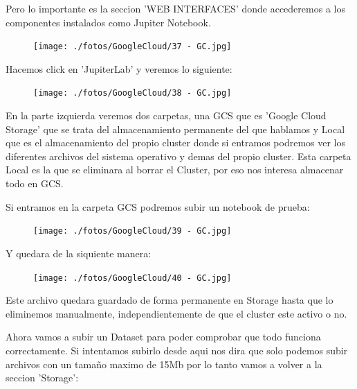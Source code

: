 \documentclass[a4paper,10pt]{article}
\begin{document}
Pero lo importante es la seccion 'WEB INTERFACES' donde accederemos a los componentes instalados como Jupiter Notebook.
 
\begin{figure}[H]
\begin{center}
\texttt{[image: ./fotos/GoogleCloud/37 - GC.jpg]}
\end{center}
\end{figure}

Hacemos click en 'JupiterLab' y veremos lo siguiente:

\begin{figure}[H]
\begin{center}
\texttt{[image: ./fotos/GoogleCloud/38 - GC.jpg]}
\end{center}
\end{figure}

En la parte izquierda veremos dos carpetas, una GCS que es 'Google Cloud Storage' que se trata del almacenamiento permanente del que hablamos y Local que es el almacenamiento del propio cluster donde si entramos podremos ver los diferentes archivos del sistema operativo y demas del propio cluster. Esta carpeta Local es la que se eliminara al borrar el Cluster, por eso nos interesa almacenar todo en GCS.

Si entramos en la carpeta GCS podremos subir un notebook de prueba:

\begin{figure}[H]
\begin{center}
\texttt{[image: ./fotos/GoogleCloud/39 - GC.jpg]}
\end{center}
\end{figure}

Y quedara de la siquiente manera:

\begin{figure}[H]
\begin{center}
\texttt{[image: ./fotos/GoogleCloud/40 - GC.jpg]}
\end{center}
\end{figure}

Este archivo quedara guardado de forma permanente en Storage hasta que lo eliminemos manualmente, independientemente de que el cluster este activo o no.

Ahora vamos a subir un Dataset para poder comprobar que todo funciona correctamente. Si intentamos subirlo desde aqui nos dira que solo podemos subir archivos con un tamaño maximo de 15Mb por lo tanto vamos a volver a la seccion 'Storage':
\end{document}
